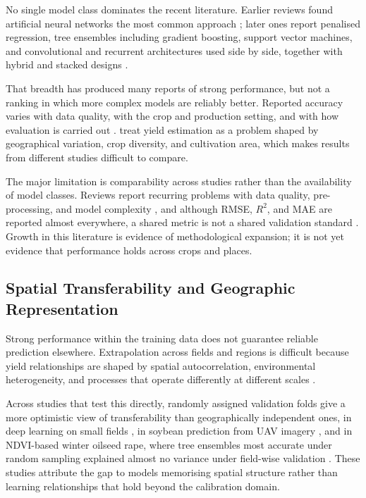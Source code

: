 \documentclass[ASNA,twocolumn]{USG}
\begin{document}
No single model class dominates the recent literature. Earlier reviews found artificial neural
networks the most common approach \cite{vanKlompenburg2020}; later ones report
penalised regression, tree ensembles including gradient boosting, support vector machines,
and convolutional and recurrent architectures used side by side, together with hybrid and
stacked designs \cite{Jabed2024,Screpnik2025,Shawon2025,Sharma2023}.

That breadth has produced many reports of strong performance, but not a ranking in which
more complex models are reliably better. Reported accuracy varies with data quality, with
the crop and production setting, and with how evaluation is carried out
\cite{Screpnik2025,Shawon2025}. \citet{Jabed2024} treat yield estimation as a
problem shaped by geographical variation, crop diversity, and cultivation area, which makes
results from different studies difficult to compare.

The major limitation is comparability across studies rather than the availability of
model classes. Reviews report
recurring problems with data quality, pre-processing, and model complexity
\cite{Jabed2024,Screpnik2025}, and although RMSE, $R^2$, and MAE are reported almost
everywhere, a shared metric is not a shared validation standard
\cite{Screpnik2025,Shawon2025}. Growth in this literature is evidence of methodological
expansion; it is not yet evidence that performance holds across crops and places.

\subsection{Spatial Transferability and Geographic Representation}

Strong performance within the training data does not guarantee reliable prediction
elsewhere. Extrapolation across fields and regions is difficult because yield relationships
are shaped by spatial autocorrelation, environmental heterogeneity, and processes that
operate differently at different scales \cite{Habibi2024,Stiller2024}.

Across studies that test this directly, randomly assigned validation folds give a more
optimistic view of transferability than geographically independent ones, in deep learning on
small fields \cite{Stiller2024}, in soybean prediction from UAV imagery
\cite{Habibi2024}, and in NDVI-based winter oilseed rape, where tree ensembles most
accurate under random sampling explained almost no variance under field-wise validation
\cite{Okupska2026}. These studies attribute the gap to models memorising spatial structure rather than learning
relationships that hold beyond the calibration domain.
\end{document}
